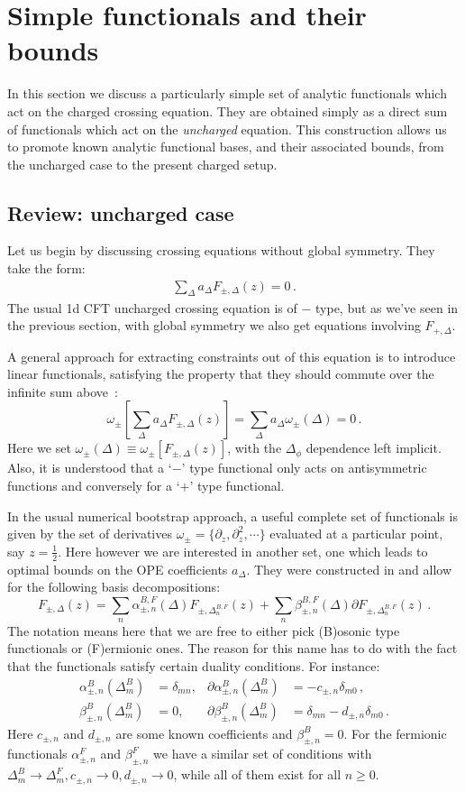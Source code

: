 \documentclass[12pt]{article}
\numberwithin{equation}{section}
\newcommand{\be}{\begin{equation}}
\newcommand{\ee}{\end{equation}}
\newcommand{\ba}{\begin{equation}\begin{aligned}}
\newcommand{\ea}{\end{aligned}\end{equation}}
\def\a{\alpha}
\def\b{\beta}
\def\d{\delta}
\def\D{\Delta}
\begin{document}
	
	\section{Simple functionals and their bounds}
	\label{sec:simplefuncs}
	In this section we discuss a particularly simple set of analytic functionals which act on the charged crossing equation. They are obtained simply as a direct sum of functionals which act on the {\em uncharged} equation. This construction allows us to promote known analytic functional bases, and their associated bounds, from the uncharged case to the present charged setup.
	
	\subsection{Review: uncharged case}
	
	Let us begin by discussing crossing equations without global symmetry. They take the form:
	\ba
	\sum_{\Delta} a_{\Delta} F_{\pm,\Delta}(z)=0\,.
	\ea
	The usual 1d CFT uncharged crossing equation is of $-$ type, but as we've seen in the previous section, with global symmetry we also get equations involving $F_{+,\Delta}$.
	
	A general approach for extracting constraints out of this equation is to introduce linear functionals, satisfying the property that they should commute over the infinite sum above~\cite{Qiao:2017lkv}:
	\be
	\omega_{\pm} \left[\sum_\D a_{\D}F_{\pm,\D}(z)\right]=\sum_\D a_{\D}\omega_{\pm} (\D)=0\,.
	\ee
	Here we set $\omega_{\pm} (\D)\equiv \omega_{\pm}[F_{\pm,\D}(z)]$, with the $\D_\phi$ dependence left implicit. Also, it is understood that a `$-$' type functional only acts on antisymmetric functions and conversely for a `$+$' type functional.
	
	In the usual numerical bootstrap approach, a useful complete set of functionals is given by the set of derivatives $\omega_{\pm}=\{\partial_z,\partial_z^2,\cdots\}$ evaluated at a particular point, say $z=\frac{1}{2}$. Here however we are interested in another set, one which leads to optimal bounds on the OPE coefficients $a_{\Delta}$. They were constructed in  \cite{Paulos:2019gtx, Mazac:2016qev,Mazac:2018mdx, Mazac:2018ycv} and allow for the following basis decompositions:
	\be\label{basis}
	F_{\pm,\D} (z)=\sum_n \a_{\pm,n}^{B,F}(\D) F_{\pm,\D^{B,F}_n}(z)+\sum_n \b_{\pm,n}^{B,F}(\D)\partial F_{\pm,\D^{B,F}_n}(z)\,.
	\ee 
	The notation means here that we are free to either pick (B)osonic type functionals or (F)ermionic ones. The reason for this name has to do with the fact that the functionals satisfy certain duality conditions. For instance:
	\begin{align}
	\a_{\pm,n}^B(\D^B_m)&=\d_{mn},& \partial \a_{\pm,n}^B(\D^B_m)&=-c_{\pm,n}\d_{m0}\,,\nonumber\\
	\b_{\pm,n}^B(\D^B_m)&=0,& \partial \b_{\pm,n}^B(\D^B_m)&=\d_{mn}-d_{\pm,n}\d_{m0}\,.
	\end{align}
	Here $c_{\pm,n}$ and $d_{\pm,n}$ are some known coefficients and $\b_{\pm,n}^B=0$. For the fermionic functionals $\a_{\pm,n}^F$ and $\b_{\pm,n}^F$ we have a similar set of conditions with $\D_m^B\to \D_m^F, c_{\pm,n}\to 0,  d_{\pm,n}\to 0$, while all of them exist for all $n\ge 0$. 
	
\end{document}
